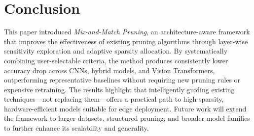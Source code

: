 \documentclass[11pt, conference]{IEEEtran}
\begin{document}
\FloatBarrier
\section{Conclusion}
\label{sec:conclusion}
This paper introduced \textit{Mix-and-Match Pruning}, an architecture-aware framework that improves the effectiveness of existing pruning algorithms through layer-wise sensitivity exploration and adaptive sparsity allocation. By systematically combining user-selectable criteria, the method produces consistently lower accuracy drop across CNNs, hybrid models, and Vision Transformers, outperforming representative baselines without requiring new pruning rules or expensive retraining. The results highlight that intelligently guiding existing techniques—not replacing them—offers a practical path to high-sparsity, hardware-efficient models suitable for edge deployment. Future work will extend the framework to larger datasets, structured pruning, and broader model families to further enhance its scalability and generality.
\end{document}
